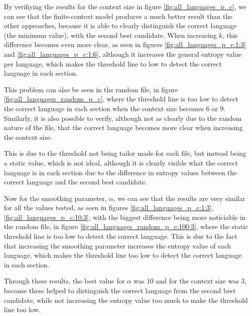 \documentclass{article}
\begin{document}
By verifiying the results for the context size in figure \ref{fig:all_languages_p_c}, we can see that the finite-context model produces a much better result than the other approaches,
because it is able to clearly distinguish the correct language (the minimum value), with the second best candidate.
When increasing $k$, this difference becomes even more clear, as seen in figures \ref{fig:all_languages_p_c:1:3} and \ref{fig:all_languages_p_c:1:6},
although it increases the general entropy value per language, which makes the threshold line to low to detect the correct language in each section.

This problem can also be seen in the random file, in figure \ref{fig:all_languages_random_p_c}, where the threshold line is too low to detect the correct language in each section when the context size
becomes $6$ or $9$.
Similarly, it is also possible to verify, although not as clearly due to the random nature of the file, that the correct language becomes more clear when increasing the context size.

This is due to the threshold not being tailor made for each file, but instead being a static value, which is not ideal, although it is clearly visible what the correct language is
in each section due to the difference in entropy values between the correct language and the second best candidate.

Now for the smoothing parameter, $\alpha$, we can see that the results are very similar for all the values tested, as seen in figures \ref{fig:all_languages_p_c:1:3}, \ref{fig:all_languages_p_c:10:3},
with the biggest difference being more noticiable in the random file, in figure \ref{fig:all_languages_random_p_c:100:3}, where the static threshold line is too low to detect the correct language.
This is due to the fact that increasing the smoothing parameter increases the entropy value of each language, which makes the threshold line too low to detect the correct language in each section.

Through these results, the best value for $\alpha$ was $10$ and for the context size was $3$, because these helped to distinguish the correct language from the second best candidate, while not increasing the entropy value too much to make the threshold line too low.
\end{document}
